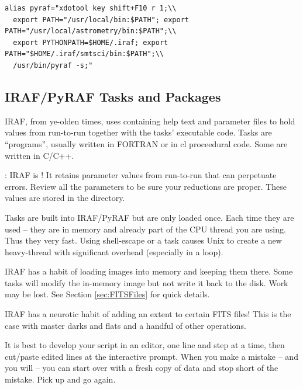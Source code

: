 \begingroup \fontsize{10pt}{10pt}
\selectfont
\begin{verbatim} 
alias pyraf="xdotool key shift+F10 r 1;\\
  export PATH="/usr/local/bin:$PATH"; export PATH="/usr/local/astrometry/bin:$PATH";\\
  export PYTHONPATH=$HOME/.iraf; export PATH="$HOME/.iraf/smtsci/bin:$PATH";\\
  /usr/bin/pyraf -s;"
\end{verbatim}
\endgroup

\subsection{IRAF/PyRAF Tasks and Packages}

IRAF, from ye-olden times, uses  containing help text
and parameter files to hold values from run-to-run together with the tasks'
executable code.
 Tasks are ``programs'', usually written in FORTRAN
or in cl proceedural code. Some are written in C/C++.

: IRAF is ! It retains parameter values from
run-to-run that can perpetuate errors. Review all the parameters to be
sure your reductions are proper. These values are stored in the
 directory.

Tasks are built into IRAF/PyRAF but are only loaded once. Each time
they are used -- they are in memory and already part of the CPU thread
you are using. Thus they very fast. Using \llbox{!} shell-escape or a
 task causes Unix to create a new heavy-thread with
significant overhead (especially in a loop).

IRAF has a habit of loading images into memory and keeping them there.
Some tasks will modify the in-memory image but not write it back to
the disk. Work may be lost. See Section \ref{sec:FITSFiles} for quick
details.

IRAF has a neurotic habit of  adding an extent to
certain FITS files! This is the case with master darks and flats
and a handful of other operations.

It is best to develop your  script in an editor, one line
and step at a time, then cut/paste edited lines at the interactive
prompt. When you make a mistake -- and you will -- you can start over
with a fresh copy of data and stop short of the mistake. Pick up and
go again.

